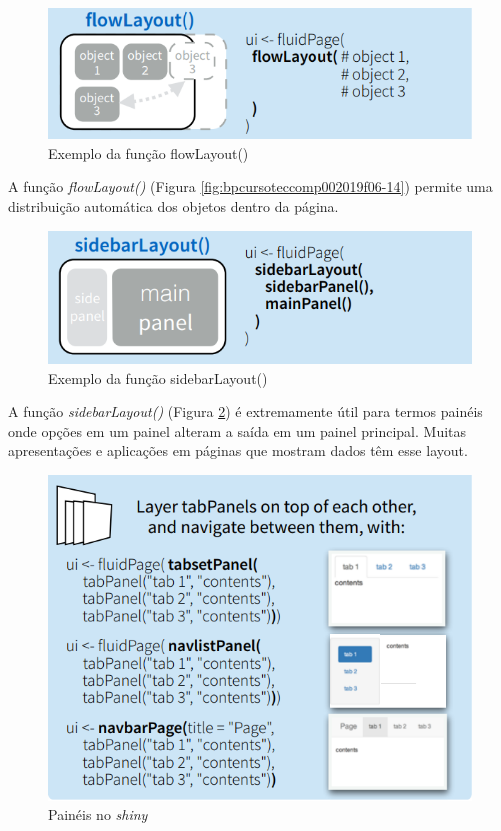 \documentclass[12pt,a4paper,oneside]{erdc}
\begin{document}
\begin{figure}[htpb]
	\centering
	\includegraphics[width=0.7\linewidth]{../figs/BP_Curso_TecComp_00_2019_f06-15}
	\caption{Exemplo da função flowLayout()}
	\label{fig:bpcursoteccomp002019f06-15}
\end{figure}

A função \textit{flowLayout()} (Figura \ref{fig:bpcursoteccomp002019f06-14}) permite uma distribuição automática dos objetos dentro da página.

\begin{figure}[htpb]
	\centering
	\includegraphics[width=0.7\linewidth]{../figs/BP_Curso_TecComp_00_2019_f06-16}
	\caption{Exemplo da função sidebarLayout()}
	\label{fig:bpcursoteccomp002019f06-16}
\end{figure}

A função \textit{sidebarLayout()} (Figura \ref{fig:bpcursoteccomp002019f06-16}) é extremamente útil para termos painéis onde opções em um painel alteram a saída em um painel principal. Muitas apresentações e aplicações em páginas que mostram dados têm esse layout. 



\begin{figure}
	\centering
	\includegraphics[width=0.6\linewidth]{../figs/BP_Curso_TecComp_00_2019_f06-19}
	\caption{Painéis no \textit{shiny}}
	\label{fig:bpcursoteccomp002019f06-19}
\end{figure}
\end{document}
